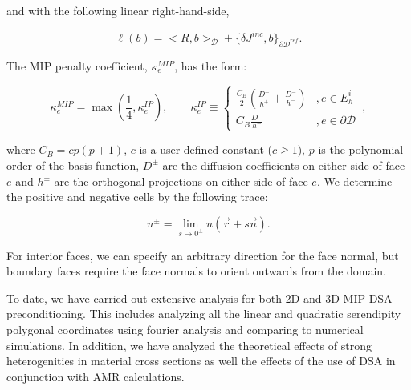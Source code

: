 \documentclass[11pt]{article}
\begin{document}
\noindent and with the following linear right-hand-side,

\begin{equation}
\label{eq::mip_rhs}
\ell(b) = \Big<  R, b  \Big>_{\mathcal{D}} + \Big\{ \delta  J^{inc}, b \Big\}_{\partial \mathcal{D}^{ref}} .
\end{equation}

\noindent The MIP penalty coefficient, $\kappa_e^{MIP}$, has the form:

\begin{equation}
\label{eq::ip_penalty}
\kappa_e^{MIP} = \max(\frac{1}{4}, \kappa_e^{IP}) , \qquad
\kappa_e^{IP}  \equiv 
		\begin{cases}
		\frac{C_B}{2} \left(  \frac{D^+}{h^+} + \frac{D^-}{h^-}  \right) & , e \in E_h^i \\
		C_B \frac{D^-}{h^-}  & , e \in \partial \mathcal{D}
		\end{cases} \, ,
\end{equation}

\noindent where $C_B=cp(p+1)$, $c$ is a user defined constant ($c \geq 1$), $p$ is the polynomial order of the basis function, $D^{\pm}$ are the diffusion coefficients on either side of face $e$ and $h^{\pm}$ are the orthogonal projections on either side of face $e$. We determine the positive and negative cells by the following trace:

\begin{equation}
\label{eq::mip_trace}
u^{\pm} = \lim_{s \rightarrow 0^{\pm}} u (\vec{r} + s \vec{n}) .
\end{equation}

\noindent For interior faces, we can specify an arbitrary direction for the face normal, but boundary faces require the face normals to orient outwards from the domain.

To date, we have carried out extensive analysis for both 2D and 3D MIP DSA preconditioning. This includes analyzing all the linear and quadratic serendipity polygonal coordinates using fourier analysis and comparing to numerical simulations. In addition, we have analyzed the theoretical effects of strong heterogenities in material cross sections as well the effects of the use of DSA in conjunction with AMR calculations. 
\end{document}
